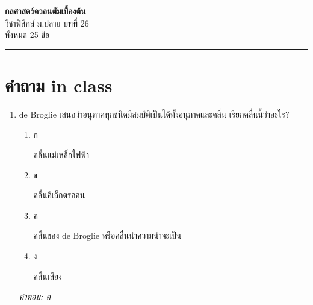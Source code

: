 \documentclass[12pt]{article}
\begin{document}
\begin{center}
{\Large\textbf{กลศาสตร์ควอนตัมเบื้องต้น}}\\[6pt]
{\normalsize วิชาฟิสิกส์ ม.ปลาย บทที่ 26}\\[4pt]
{\footnotesize ทั้งหมด 25 ข้อ}
\end{center}
\hrule
\bigskip

\section*{คำถาม in class}
\begin{enumerate}[label=\arabic*., itemsep=0.5\baselineskip, topsep=0.5\baselineskip, leftmargin=*]
\item de Broglie เสนอว่าอนุภาคทุกชนิดมีสมบัติเป็นได้ทั้งอนุภาคและคลื่น เรียกคลื่นนี้ว่าอะไร?
\begin{enumerate}[label=\alph*)., itemsep=0.3\baselineskip, topsep=0.3\baselineskip]
\item ก\ 
\begin{minipage}[t]{0.9\linewidth}
\raggedright คลื่นแม่เหล็กไฟฟ้า
\end{minipage}
\item ข\ 
\begin{minipage}[t]{0.9\linewidth}
\raggedright คลื่นอิเล็กตรออน
\end{minipage}
\item ค\ 
\begin{minipage}[t]{0.9\linewidth}
\raggedright คลื่นของ de Broglie หรือคลื่นนำความน่าจะเป็น
\end{minipage}
\item ง\ 
\begin{minipage}[t]{0.9\linewidth}
\raggedright คลื่นเสียง
\end{minipage}
\end{enumerate}
\vspace{-0.3\baselineskip}
\begin{small}
\textit{คำตอบ: ค}
\end{small}


\end{enumerate}
\end{document}
